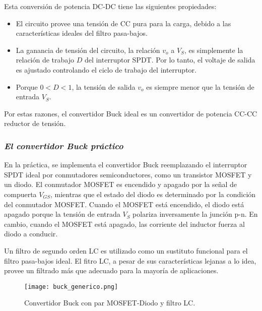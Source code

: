 Esta conversión de potencia DC-DC tiene las siguientes propiedades:
\begin{itemize}[noitemsep]
    \item El circuito provee una tensión de CC pura para la carga, debido a las características ideales del filtro pasa-bajos.
    \item La ganancia de tensión del circuito, la relación $v_o$ a $V_S$, es simplemente la relación de trabajo $D$ del interruptor SPDT. Por lo tanto, el voltaje de salida
    es ajustado controlando el ciclo de trabajo del interruptor.
    \item Porque $0 < D < 1$, la tensión de salida $v_o$ es siempre menor que la tensión de entrada $V_S$.
\end{itemize}

Por estas razones, el convertidor Buck ideal es un convertidor de potencia CC-CC reductor de tensión.

\subsubsection*{\it{El convertidor Buck práctico}}
\vspace{-0.25cm}
En la práctica, se implementa el convertidor Buck reemplazando el interruptor SPDT ideal por conmutadores semiconductores, como un transistor MOSFET y un diodo.
El conmutador MOSFET es encendido y apagado por la señal de compuerta $V_{GS}$, mientras que el estado del diodo es determinado por la condición del conmutador MOSFET.
Cuando el MOSFET está encendido, el diodo está apagado porque la tensión de entrada $V_S$ polariza inversamente la junción p-n. En cambio, cuando el MOSFET está apagado,
las corriente del inductor fuerza al diodo a conducir.

Un filtro de segundo orden LC es utilizado como un sustituto funcional para el filtro pasa-bajos ideal. El fitro LC, a pesar de sus características lejanas a lo idea, provee
un filtrado más que adecuado para la mayoría de aplicaciones.

\begin{figure}[H]
    \centering
    \texttt{[image: buck\_generico.png]}
    \vspace{-0.25cm}
    \caption{Convertidor Buck con par MOSFET-Diodo y filtro LC.}
    \label{fig:sistema_convertidor}
\end{figure}
\vspace{-0.5cm}
\parencite{CHOI} %